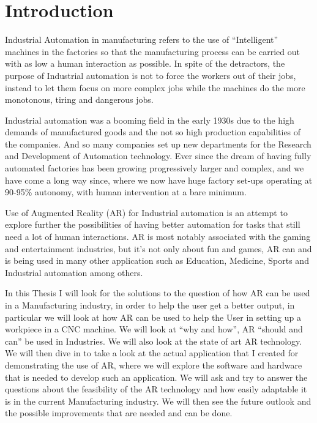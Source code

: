 \chapter{Introduction}


Industrial Automation in manufacturing refers to the use of “Intelligent” machines in the factories so that the manufacturing process can be carried out with as low a human interaction as possible. In spite of the detractors, the purpose of Industrial automation is not to force the workers out of their jobs, instead to let them focus on more complex jobs while the machines do the more monotonous, tiring and dangerous jobs. 


Industrial automation was a booming field in the early 1930s due to the high demands of manufactured goods and the not so high production capabilities of the companies. And so many companies set up new departments for the Research and Development of Automation technology. Ever since the dream of having fully automated factories has been growing progressively larger and complex, and we have come a long way since, where we now have huge factory set-ups operating at 90-95\% autonomy, with human intervention at a bare minimum.


Use of Augmented Reality (AR) for Industrial automation is an attempt to explore further the possibilities of having better automation for tasks that still need a lot of human interactions. AR is most notably associated with the gaming and entertainment industries, but it’s not only about fun and games, AR can and is being used in many other application such as Education, Medicine, Sports and Industrial automation among others.


In this Thesis I will look for the solutions to the question of how AR can be used in a Manufacturing industry, in order to help the user get a better output, in particular we will look at how AR can be used to help the User in setting up a workpiece in a CNC machine. We will look at “why and how”, AR “should and can” be used in Industries. We will also look at the state of art AR technology. We will then dive in to take a look at the actual application that I created for demonstrating the use of AR, where we will explore the software and hardware that is needed to develop such an application. We will ask and try to answer the questions about the feasibility of the AR technology and how easily adaptable it is in the current Manufacturing industry. We will then see the future outlook and the possible improvements that are needed and can be done.


